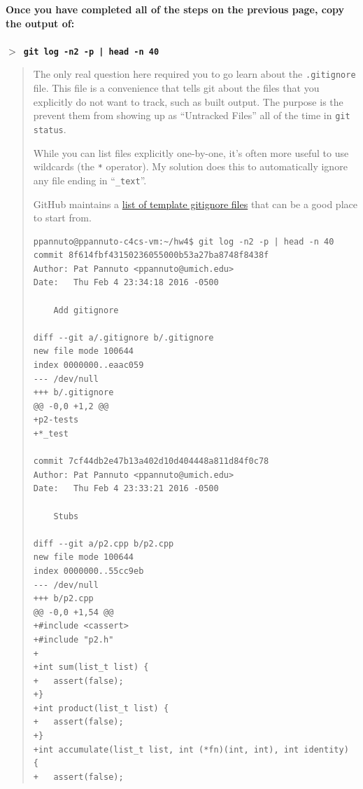 \documentclass{article}
\begin{document}
\textbf{Once you have completed all of the steps on the previous page, copy
the output of:\\
~\\
\texttt{$>$ git log -n2 -p | head -n 40}}

\begin{quote}
  \color{violet}
  The only real question here required you to go learn about the
  \texttt{.gitignore} file. This file is a convenience that tells git about
  the files that you explicitly do not want to track, such as built output.
  The purpose is the prevent them from showing up as ``Untracked Files'' all
  of the time in \texttt{git status}.

  While you can list files explicitly one-by-one, it's often more useful to
  use wildcards (the \texttt{*} operator). My solution does this to
  automatically ignore any file ending in ``\texttt{\_text}''.

  GitHub maintains a \href{https://github.com/github/gitignore}{list of
  template gitignore files} that can be a good place to start from.

  \begin{lstlisting}
ppannuto@ppannuto-c4cs-vm:~/hw4$ git log -n2 -p | head -n 40
commit 8f614fbf43150236055000b53a27ba8748f8438f
Author: Pat Pannuto <ppannuto@umich.edu>
Date:   Thu Feb 4 23:34:18 2016 -0500

    Add gitignore

diff --git a/.gitignore b/.gitignore
new file mode 100644
index 0000000..eaac059
--- /dev/null
+++ b/.gitignore
@@ -0,0 +1,2 @@
+p2-tests
+*_test

commit 7cf44db2e47b13a402d10d404448a811d84f0c78
Author: Pat Pannuto <ppannuto@umich.edu>
Date:   Thu Feb 4 23:33:21 2016 -0500

    Stubs

diff --git a/p2.cpp b/p2.cpp
new file mode 100644
index 0000000..55cc9eb
--- /dev/null
+++ b/p2.cpp
@@ -0,0 +1,54 @@
+#include <cassert>
+#include "p2.h"
+
+int sum(list_t list) {
+	assert(false);
+}
+int product(list_t list) {
+	assert(false);
+}
+int accumulate(list_t list, int (*fn)(int, int), int identity) {
+	assert(false);
  \end{lstlisting}
\end{quote}
\end{document}
